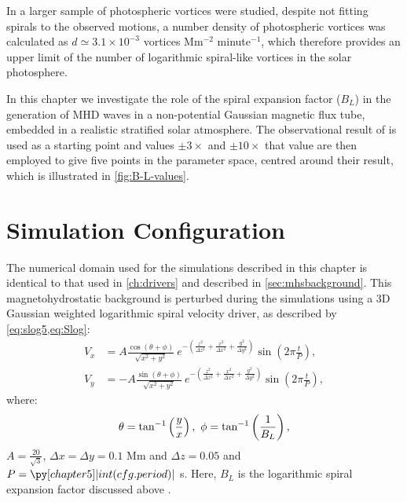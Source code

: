 In \cite{bonet2010} a larger sample of photospheric vortices were studied, despite not fitting spirals to the observed motions, a number density of photospheric vortices was calculated as $d \simeq 3.1 \times 10^{-3}$ vortices Mm$^{-2}$ minute$^{-1}$, which therefore provides an upper limit of the number of logarithmic spiral-like vortices in the solar photosphere.

In this chapter we investigate the role of the spiral expansion factor ($B_L$) in the generation of MHD waves in a non-potential Gaussian magnetic flux tube, embedded in a realistic stratified solar atmosphere.
The observational result of \cite{bonet2008} is used as a starting point and values $\pm 3\times$ and $\pm 10\times$ that value are then employed to give five points in the parameter space, centred around their result, which is illustrated in \cref{fig:B-L-values}.


\section{Simulation Configuration}\label{sec:simconfig}
The numerical domain used for the simulations described in this chapter is identical to that used in \cref{ch:drivers} and described in \cref{sec:mhsbackground}.
This magnetohydrostatic background is perturbed during the simulations using a 3D Gaussian weighted logarithmic spiral velocity driver, as described by \cref{eq:slog5,eq:Slog}:
\begin{subequations}
    \begin{align}
    V_x &= A \frac{\cos(\theta + \phi)}{\sqrt{x^2 + y^2}}\ e^{-\left(\frac{z^2}{\Delta z^2} + \frac{x^2}{\Delta x^2} + \frac{y^2}{\Delta y^2}\right)} \sin \left(2\pi \frac{t}{P}\right),\\
    V_y &= - A \frac{\sin(\theta + \phi)}{\sqrt{x^2 + y^2}}\ e^{-\left(\frac{z^2}{\Delta z^2} + \frac{x^2}{\Delta x^2} + \frac{y^2}{\Delta y^2}\right)} \sin \left(2\pi \frac{t}{P}\right),
    \end{align}
    \label{eq:slog5}
\end{subequations}
where:
\begin{equation*}
\theta = \tan^{-1}\left(\frac{y}{x}\right),\ \phi = \tan^{-1}\left(\frac{1}{B_L}\right),\notag	
\end{equation*}
$A=\frac{20}{\sqrt{3}}$, $\Delta x = \Delta y = 0.1$ Mm and $\Delta z = 0.05$ and $P=\py[chapter5]|int(cfg.period)|$ s.
Here, $B_L$ is the logarithmic spiral expansion factor discussed above  \citep{mumford2015}.

